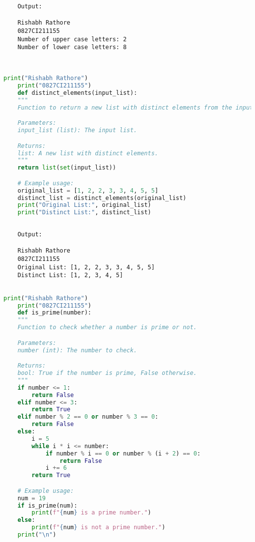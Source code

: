 \documentclass{report}
\begin{document}
\begin{verbatim}
	Output:

	Rishabh Rathore
	0827CI211155
	Number of upper case letters: 2
	Number of lower case letters: 8
	
	

\end{verbatim}


\bigskip


\sol 
\begin{lstlisting}[language=Python]
	print("Rishabh Rathore")
	print("0827CI211155")
	def distinct_elements(input_list):
    """
    Function to return a new list with distinct elements from the input list.

    Parameters:
    input_list (list): The input list.

    Returns:
    list: A new list with distinct elements.
    """
    return list(set(input_list))

	# Example usage:
	original_list = [1, 2, 2, 3, 3, 4, 5, 5]
	distinct_list = distinct_elements(original_list)
	print("Original List:", original_list)
	print("Distinct List:", distinct_list)
  

\end{lstlisting}

\begin{verbatim}
	Output:

	Rishabh Rathore
	0827CI211155
	Original List: [1, 2, 2, 3, 3, 4, 5, 5]
	Distinct List: [1, 2, 3, 4, 5]


\end{verbatim}


\bigskip


\sol 
\begin{lstlisting}[language=Python]
	print("Rishabh Rathore")
	print("0827CI211155")
	def is_prime(number):
    """
    Function to check whether a number is prime or not.

    Parameters:
    number (int): The number to check.

    Returns:
    bool: True if the number is prime, False otherwise.
    """
    if number <= 1:
        return False
    elif number <= 3:
        return True
    elif number % 2 == 0 or number % 3 == 0:
        return False
    else:
        i = 5
        while i * i <= number:
            if number % i == 0 or number % (i + 2) == 0:
                return False
            i += 6
        return True

	# Example usage:
	num = 19
	if is_prime(num):
		print(f"{num} is a prime number.")
	else:
		print(f"{num} is not a prime number.")
	print("\n")
\end{lstlisting}
\end{document}
